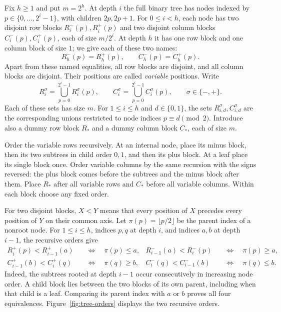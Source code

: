 Fix $h\ge1$ and put $m=2^h$.  At depth $i$ the full binary tree has
nodes indexed by $p\in\{0,\ldots,2^i-1\}$, with children $2p,2p+1$.
For $0\le i<h$, each node has two disjoint row blocks
$R_i^-(p),R_i^+(p)$ and two disjoint column blocks
$C_i^-(p),C_i^+(p)$, each of size $m/2^i$.
At depth $h$ it has one row block and one column block of size $1$;
we give each of these two names:
\[
 R_h^-(p)=R_h^+(p),\qquad C_h^-(p)=C_h^+(p).
\]
Apart from these named equalities, all row blocks are disjoint, and all
column blocks are disjoint.  Their positions are called \emph{variable}
positions.  Write
\[
 R_i^\sigma=\bigcup_{p=0}^{2^i-1}R_i^\sigma(p),
 \qquad
 C_i^\sigma=\bigcup_{p=0}^{2^i-1}C_i^\sigma(p),
 \qquad \sigma\in\{-,+\}.
\]
Each of these sets has size $m$.  For $1\le i\le h$ and
$d\in\{0,1\}$, the sets $R_{i,d}^\sigma,C_{i,d}^\sigma$ are the
corresponding unions restricted to node indices $p\equiv d\pmod2$.
Introduce also a dummy row block $R_*$ and a dummy column block $C_*$,
each of size $m$.

Order the variable rows recursively.  At an internal node, place its
minus block, then its two subtrees in child order $0,1$, and then its
plus block.  At a leaf place its single block once.  Order variable
columns by the same recursion with the signs reversed: the plus block
comes before the subtrees and the minus block after them.
Place $R_*$ after all variable rows and $C_*$ before all variable
columns.  Within each block choose any fixed order.

For two disjoint blocks, $X<Y$ means that every position of $X$ precedes
every position of $Y$ on their common axis.  Let
$\pi(p)=\lfloor p/2\rfloor$ be the parent index of a nonroot node.
For $1\le i\le h$, indices $p,q$ at depth $i$, and indices $a,b$ at
depth $i-1$, the recursive orders give
\begin{equation}
 \begin{aligned}
 R_i^+(p)<R_{i-1}^+(a)
    &\quad\Longleftrightarrow\quad \pi(p)\le a,&
 R_{i-1}^-(a)<R_i^-(p)
    &\quad\Longleftrightarrow\quad \pi(p)\ge a,\\
 C_{i-1}^+(b)<C_i^+(q)
    &\quad\Longleftrightarrow\quad \pi(q)\ge b,&
 C_i^-(q)<C_{i-1}^-(b)
    &\quad\Longleftrightarrow\quad \pi(q)\le b.
 \end{aligned}
 \label{eq:tree-orders}
\end{equation}
Indeed, the subtrees rooted at depth $i-1$ occur consecutively in
increasing node order.  A child block lies between the two blocks of
its own parent, including when that child is a leaf.  Comparing its
parent index with $a$ or $b$ proves all four equivalences.
Figure~\ref{fig:tree-orders} displays the two recursive orders.



